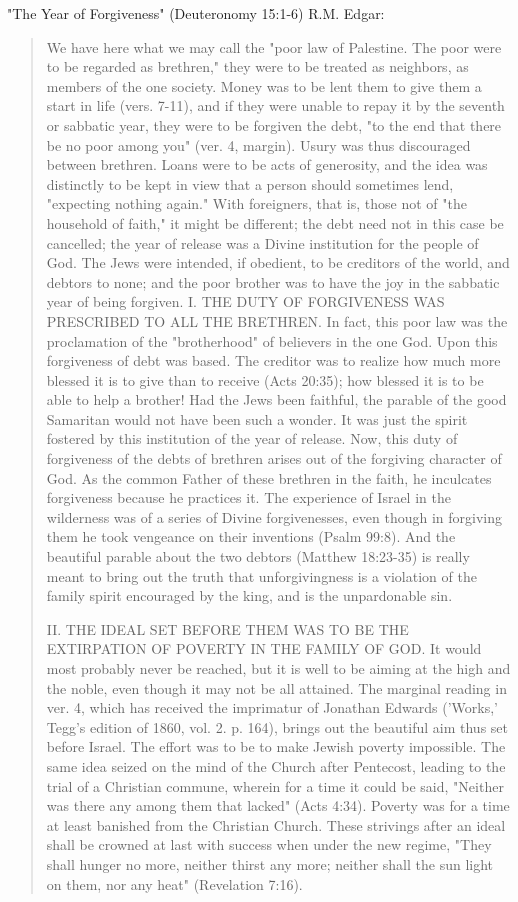 \documentclass[11pt]{article}
\begin{document}
"The Year of Forgiveness" (Deuteronomy 15:1-6) R.M. Edgar:
\begin{quote}
We have here what we may call the "poor law of Palestine. The poor were to be regarded as brethren," they were to be treated as neighbors, as members of the one society. Money was to be lent them to give them a start in life (vers. 7-11), and if they were unable to repay it by the seventh or sabbatic year, they were to be forgiven the debt, "to the end that there be no poor among you" (ver. 4, margin). Usury was thus discouraged between brethren. Loans were to be acts of generosity, and the idea was distinctly to be kept in view that a person should sometimes lend, "expecting nothing again." With foreigners, that is, those not of "the household of faith," it might be different; the debt need not in this case be cancelled; the year of release was a Divine institution for the people of God. The Jews were intended, if obedient, to be creditors of the world, and debtors to none; and the poor brother was to have the joy in the sabbatic year of being forgiven.
I. THE DUTY OF FORGIVENESS WAS PRESCRIBED TO ALL THE BRETHREN. In fact, this poor law was the proclamation of the "brotherhood" of believers in the one God. Upon this forgiveness of debt was based. The creditor was to realize how much more blessed it is to give than to receive (Acts 20:35); how blessed it is to be able to help a brother! Had the Jews been faithful, the parable of the good Samaritan would not have been such a wonder. It was just the spirit fostered by this institution of the year of release. Now, this duty of forgiveness of the debts of brethren arises out of the forgiving character of God. As the common Father of these brethren in the faith, he inculcates forgiveness because he practices it. The experience of Israel in the wilderness was of a series of Divine forgivenesses, even though in forgiving them he took vengeance on their inventions (Psalm 99:8). And the beautiful parable about the two debtors (Matthew 18:23-35) is really meant to bring out the truth that unforgivingness is a violation of the family spirit encouraged by the king, and is the unpardonable sin.

II. THE IDEAL SET BEFORE THEM WAS TO BE THE EXTIRPATION OF POVERTY IN THE FAMILY OF GOD. It would most probably never be reached, but it is well to be aiming at the high and the noble, even though it may not be all attained. The marginal reading in ver. 4, which has received the imprimatur of Jonathan Edwards ('Works,' Tegg's edition of 1860, vol. 2. p. 164), brings out the beautiful aim thus set before Israel. The effort was to be to make Jewish poverty impossible. The same idea seized on the mind of the Church after Pentecost, leading to the trial of a Christian commune, wherein for a time it could be said, "Neither was there any among them that lacked" (Acts 4:34). Poverty was for a time at least banished from the Christian Church. These strivings after an ideal shall be crowned at last with success when under the new regime, "They shall hunger no more, neither thirst any more; neither shall the sun light on them, nor any heat" (Revelation 7:16).


\end{quote}
\end{document}
